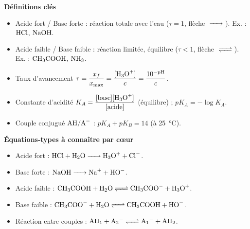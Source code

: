 \documentclass[11pt]{article}
\newcommand{\cle}[1]{{\popxbold\color{popdark}#1}}
\begin{document}
\begin{bilan}
\textbf{Définitions clés}
\begin{itemize}\setlength{\itemsep}{1pt}
  \item \cle{Acide fort} / \cle{Base forte} : réaction totale avec l'eau ($\tau = 1$, flèche $\ce{->}$). Ex. : $\ce{HCl}$, $\ce{NaOH}$.
  \item \cle{Acide faible} / \cle{Base faible} : réaction limitée, équilibre ($\tau < 1$, flèche $\ce{<=>}$). Ex. : $\ce{CH3COOH}$, $\ce{NH3}$.
  \item \cle{Taux d'avancement} $\tau = \dfrac{x_f}{x_{\max}} = \dfrac{[\ce{H3O+}]}{c} = \dfrac{10^{-\text{pH}}}{c}$.
  \item \cle{Constante d'acidité} $K_A = \dfrac{[\text{base}][\ce{H3O+}]}{[\text{acide}]}$ (équilibre) ; $pK_A = -\log K_A$.
  \item \cle{Couple conjugué} $\ce{AH}/\ce{A-}$ : $pK_A + pK_B = 14$ (à \SI{25}{\celsius}).
\end{itemize}

\textbf{Équations-types à connaître par cœur}
\begin{itemize}\setlength{\itemsep}{1pt}
  \item Acide fort : $\ce{HCl + H2O -> H3O+ + Cl-}$.
  \item Base forte : $\ce{NaOH -> Na+ + HO-}$.
  \item Acide faible : $\ce{CH3COOH + H2O <=> CH3COO- + H3O+}$.
  \item Base faible : $\ce{CH3COO- + H2O <=> CH3COOH + HO-}$.
  \item Réaction entre couples : $\ce{AH1 + A2- <=> A1- + AH2}$.
\end{itemize}


\end{bilan}
\end{document}
